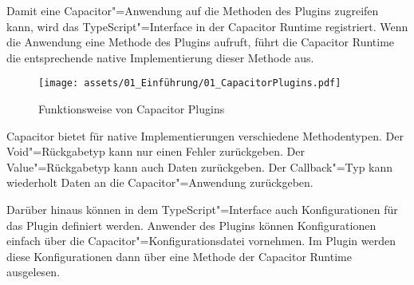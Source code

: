 Damit eine Capacitor"=Anwendung auf die Methoden des Plugins zugreifen kann, wird das TypeScript"=Interface in der Capacitor Runtime registriert.
Wenn die Anwendung eine Methode des Plugins aufruft, führt die Capacitor Runtime die entsprechende native Implementierung dieser Methode aus.

\begin{figure}[H]
  \centering
  \texttt{[image: assets/01\_Einführung/01\_CapacitorPlugins.pdf]}
  \caption{Funktionsweise von Capacitor Plugins}
\end{figure}

\vspace{-1em}

Capacitor bietet für native Implementierungen verschiedene Methodentypen.
Der Void"=Rückgabetyp kann nur einen Fehler zurückgeben.
Der Value"=Rückgabetyp kann auch Daten zurückgeben.
Der Callback"=Typ kann wiederholt Daten an die Capacitor"=Anwendung zurückgeben.
\cite{capacitor:docs}

Darüber hinaus können in dem TypeScript"=Interface auch Konfigurationen für das Plugin definiert werden.
Anwender des Plugins können Konfigurationen einfach über die Capacitor"=Konfigurationsdatei vornehmen.
Im Plugin werden diese Konfigurationen dann über eine Methode der Capacitor Runtime ausgelesen.
\cite{capacitor:docs}
